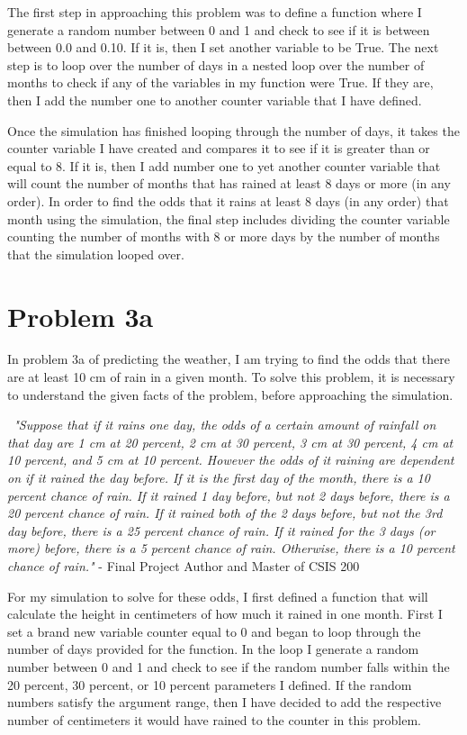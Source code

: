 \documentclass[twocolumn]{revtex4}
\begin{document}
	 The first step in approaching this problem was to define a function where I generate a random number between 0 and 1 and check to see if it is between between 0.0 and 0.10. If it is, then I set another variable to be True. The next step is to loop over the number of days in a nested loop over the number of months to check if any of the variables in my function were True. If they are, then I add the number one to another counter variable that I have defined. 

	Once the simulation has finished looping through the number of days, it takes the counter variable I have created and compares it to see if it is greater than or equal to 8. If it is, then I add number one to yet another counter variable that will count the number of months that has rained at least 8 days or more (in any order). In order to find the odds that it rains at least 8 days (in any order) that month using the simulation, the final step includes dividing the counter variable counting the number of months with 8 or more days by the number of months that the simulation looped over. 

\section{Problem 3a}
	In problem 3a of predicting the weather, I am trying to find the odds that there are at least 10 cm of rain in a given month. To solve this problem, it is necessary to understand the given facts of the problem, before approaching the simulation. 
	
	{\it~"Suppose that if it rains one day, the odds of a certain amount of rainfall on that day are 1 cm at 20 percent, 2 cm at 30 percent, 3 cm at 30 percent, 4 cm at 10 percent, and 5 cm at 10 percent. However the odds of it raining are dependent on if it rained the day before. If it is the first day of the month, there is a 10 percent chance of rain. If it rained 1 day before, but not 2 days before, there is a 20 percent chance of rain.  If it rained both of the 2 days before, but not the 3rd day before, there is a 25 percent chance of rain. If it rained for the 3 days (or more) before, there is a 5 percent chance of rain. Otherwise, there is a 10 percent chance of rain."}
	- Final Project Author and Master of CSIS 200
	
	For my simulation to solve for these odds, I first defined a function that will calculate the height in centimeters of how much it rained in one month. First I set a brand new variable counter equal to 0 and began to loop through the number of days provided for the function. In the loop I generate a random number between 0 and 1 and check to see if the random number falls within the 20 percent, 30 percent, or 10 percent parameters I defined. If the random numbers satisfy the argument range, then I have decided to add the respective number of centimeters it would have rained to the counter in this problem. 
\end{document}
